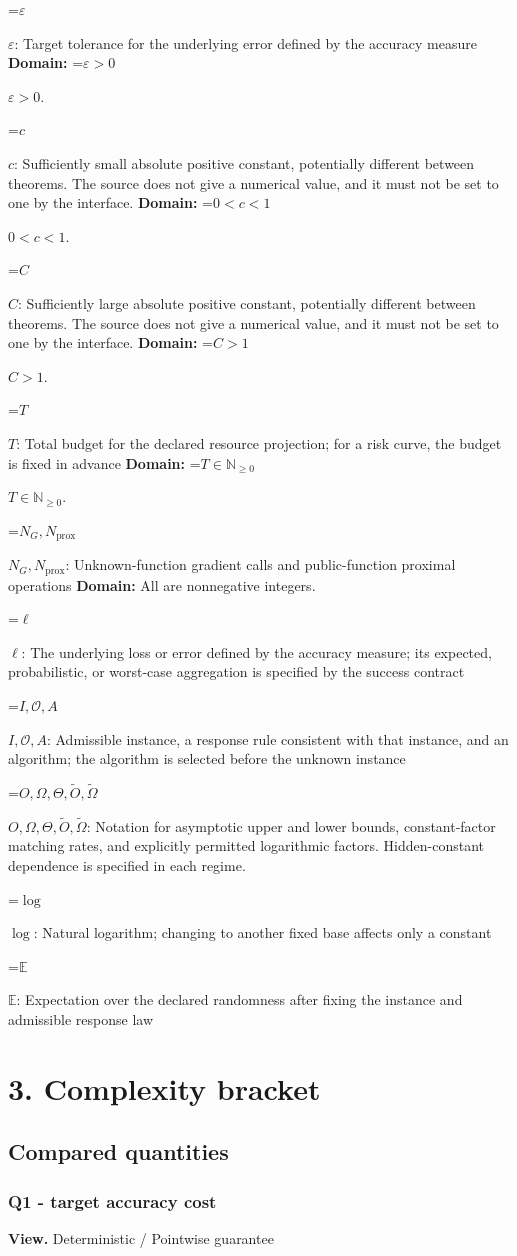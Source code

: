 \documentclass[10pt,a4paper]{article}
\newcommand{\AtlasMath}[1]{\par\begingroup\centering\setbox0=\hbox{$\displaystyle #1$}\ifdim\wd0>1.4\linewidth\typeout{ATLAS WIDE FORMULA: \the\wd0}\fi\ifdim\wd0>\linewidth\resizebox{\linewidth}{!}{\box0}\else\box0\fi\par\endgroup}
\newcommand{\AtlasInlineMath}[1]{\begingroup\setbox0=\hbox{$#1$}\ifdim\wd0>.4\linewidth\endgroup\AtlasMath{#1}\else\endgroup$#1$\fi}
\begin{document}
\AtlasInlineMath{\varepsilon}: Target tolerance for the underlying error defined by the accuracy measure \textbf{Domain:} \AtlasInlineMath{\varepsilon>0}.

\AtlasInlineMath{c}: Sufficiently small absolute positive constant, potentially different between theorems. The source does not give a numerical value, and it must not be set to one by the interface. \textbf{Domain:} \AtlasInlineMath{0<c<1}.

\AtlasInlineMath{C}: Sufficiently large absolute positive constant, potentially different between theorems. The source does not give a numerical value, and it must not be set to one by the interface. \textbf{Domain:} \AtlasInlineMath{C>1}.

\AtlasInlineMath{T}: Total budget for the declared resource projection; for a risk curve, the budget is fixed in advance \textbf{Domain:} \AtlasInlineMath{T\in\mathbb{N}_{\ge0}}.

\AtlasInlineMath{N_G,N_{\mathrm{prox}}}: Unknown-function gradient calls and public-function proximal operations \textbf{Domain:} All are nonnegative integers.

\AtlasInlineMath{\ell}: The underlying loss or error defined by the accuracy measure; its expected, probabilistic, or worst-case aggregation is specified by the success contract

\AtlasInlineMath{I,\mathcal{O},A}: Admissible instance, a response rule consistent with that instance, and an algorithm; the algorithm is selected before the unknown instance

\AtlasInlineMath{O,\Omega,\Theta,\widetilde{O},\widetilde\Omega}: Notation for asymptotic upper and lower bounds, constant-factor matching rates, and explicitly permitted logarithmic factors. Hidden-constant dependence is specified in each regime.

\AtlasInlineMath{\log}: Natural logarithm; changing to another fixed base affects only a constant

\AtlasInlineMath{\mathbb{E}}: Expectation over the declared randomness after fixing the instance and admissible response law

\section{3. Complexity bracket}
\subsection{Compared quantities}
\subsubsection{Q1 - target accuracy cost}
\textbf{View.} Deterministic / Pointwise guarantee
\end{document}

